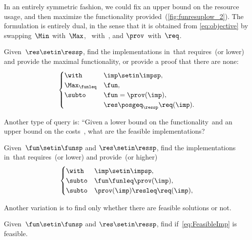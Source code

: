 In an entirely symmetric fashion, we could fix an upper bound on the resource usage, and then maximize the functionality provided~(\cref{fig:funresuplow_2}).
The formulation is entirely dual, in the sense that it is obtained from \cref{eq:objective} by swapping~$\Min$ with~$\Max$, \funsp~with~\ressp, and $\prov$~with~$\req$.

\begin{problem}[\FixResMaxFun]
\label{prob:FixResMaxFun}
Given~$\res\setin\ressp$, find the implementations in~\impsp that requires~\res (or lower) and provide the maximal functionality, or provide a proof that there are none:
\begin{equation}
    \begin{cases}
        \with          & \imp\setin\impsp,               \\
        \Max_{\funleq} & \fun,                           \\
        \subto         & \fun=\prov(\imp),               \\
                       & \res\posgeq_{\ressp}\req(\imp).
    \end{cases}\label{eq:objective-1}
\end{equation}
\end{problem}


\begin{figure*}
    \centering
    \caption{}
    \label{fig:funresuplow_2}
\end{figure*}

Another type of query is: ``Given a lower bound on the functionality~\fun and an upper bound on the costs~\fun, what are the feasible implementations?

\begin{problem}[\FeasibleImp]
\label{prob:FeasibleImp}
Given~$\fun\setin\funsp$ and $\res\setin\ressp$, find the implementations in~\impsp that requires~\res (or lower) and provide~\fun (or higher)
\begin{equation}
    \label{eq:FeasibleImp}
    \begin{cases}
        \with  & \imp\setin\impsp,                \\
        \subto & \fun \funleq \prov(\imp),        \\
        \subto & \prov(\imp) \resleq \req(\imp), \\
    \end{cases}
\end{equation}
\end{problem}

Another variation is to find only whether there are feasible solutions or not.

\begin{problem}[\Feasibility]
\label{prob:Feasibility}
Given~$\fun\setin\funsp$ and $\res\setin\ressp$, find if~\cref{eq:FeasibleImp} is feasible.
\end{problem}
